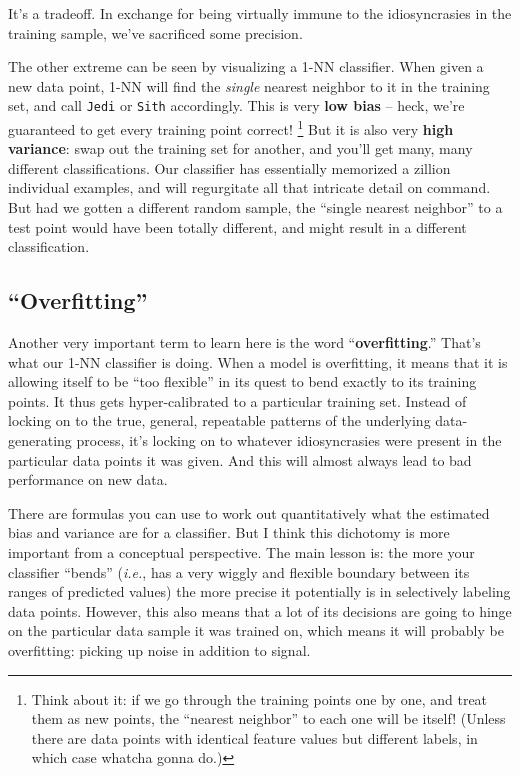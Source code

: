 It's a tradeoff. In exchange for being virtually immune to the idiosyncrasies
in the training sample, we've sacrificed some precision.


The other extreme can be seen by visualizing a 1-NN classifier. When given a
new data point, 1-NN will find the \textit{single} nearest neighbor to it in
the training set, and call \texttt{Jedi} or \texttt{Sith} accordingly. This is
very \textbf{low bias} -- heck, we're guaranteed to get every training point
correct! \footnote{Think about it: if we go through the training points one by
one, and treat them as new points, the ``nearest neighbor'' to each one will be
itself! (Unless there are data points with identical feature values but
different labels, in which case whatcha gonna do.)} But it is also very
\textbf{high variance}: swap out the training set for another, and you'll get
many, many different classifications. Our classifier has essentially memorized
a zillion individual examples, and will regurgitate all that intricate detail
on command. But had we gotten a different random sample, the ``single nearest
neighbor'' to a test point would have been totally different, and might result
in a different classification.
     
\subsection{``Overfitting''}


Another very important term to learn here is the word ``\textbf{overfitting}.''
That's what our 1-NN classifier is doing. When a model is overfitting, it means
that it is allowing itself to be ``too flexible'' in its quest to bend exactly
to its training points. It thus gets hyper-calibrated to a particular training
set. Instead of locking on to the true, general, repeatable patterns of the
underlying data-generating process, it's locking on to whatever idiosyncrasies
were present in the particular data points it was given. And this will almost
always lead to bad performance on new data.


There are formulas you can use to work out quantitatively what the estimated
bias and variance are for a classifier. But I think this dichotomy is more
important from a conceptual perspective. The main lesson is: the more your
classifier ``bends'' (\textit{i.e.}, has a very wiggly and flexible boundary
between its ranges of predicted values) the more precise it potentially is in
selectively labeling data points. However, this also means that a lot of its
decisions are going to hinge on the particular data sample it was trained on,
which means it will probably be overfitting: picking up noise in addition to
signal.

